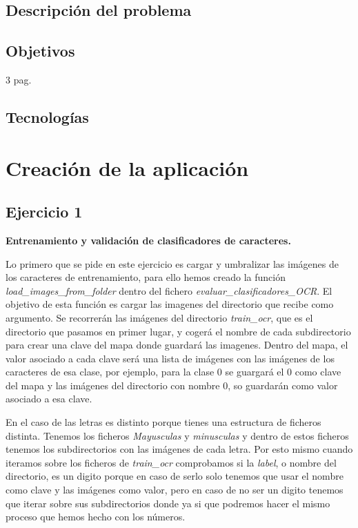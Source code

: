 \documentclass[a4paper, 12pt]{article}
\begin{document}
\subsection{Descripción del problema}

\subsection{Objetivos}
3 pag.
\subsection{Tecnologías}


\section{Creación de la aplicación}
\subsection{Ejercicio 1}
\textbf{Entrenamiento y validación de clasificadores de caracteres.}

Lo primero que se pide en este ejercicio es cargar y umbralizar las imágenes de los caracteres de entrenamiento, para ello hemos creado la función \textit{load\_images\_from\_folder} dentro del fichero \textit{evaluar\_clasificadores\_OCR}. El objetivo de esta función es cargar las imagenes del directorio que recibe como argumento. Se recorrerán las imágenes del directorio \textit{train\_ocr}, que es el directorio que pasamos en primer lugar, y cogerá el nombre de cada subdirectorio para crear una clave del mapa donde guardará las imagenes. Dentro del mapa, el valor asociado a cada clave será una lista de imágenes con las imágenes de los caracteres de esa clase, por ejemplo, para la clase 0 se guargará el 0 como clave del mapa y las imágenes del directorio con nombre 0, so guardarán como valor asociado a esa clave. 

En el caso de las letras es distinto porque tienes una estructura de ficheros distinta. Tenemos los ficheros \textit{Mayusculas} y \textit{minusculas} y dentro de estos ficheros tenemos los subdirectorios con las imágenes de cada letra. Por esto mismo cuando iteramos sobre los ficheros de \textit{train\_ocr} comprobamos si la \textit{label}, o nombre del directorio, es un digito porque en caso de serlo solo tenemos que usar el nombre como clave y las imágenes como valor, pero en caso de no ser un digito tenemos que iterar sobre sus subdirectorios donde ya si que podremos hacer el mismo proceso que hemos hecho con los números. 
\end{document}
